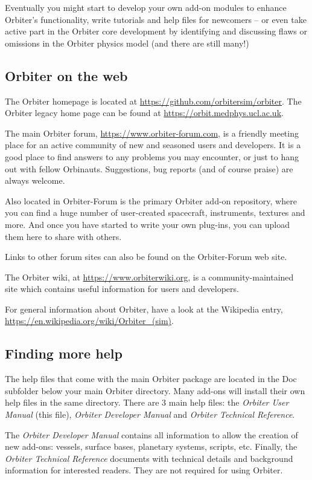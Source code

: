 \documentclass[Orbiter User Manual.tex]{subfiles}
\begin{document}
Eventually you might start to develop your own add-on modules to enhance
Orbiter's functionality, write tutorials and help files for newcomers -- or even
take active part in the Orbiter core development by identifying and discussing
flaws or omissions in the Orbiter physics model (and there are still many!)


\subsection{Orbiter on the web}

The Orbiter homepage is located at \url{https://github.com/orbitersim/orbiter}.
The Orbiter legacy home page can be found at
\url{https://orbit.medphys.ucl.ac.uk}.

The main Orbiter forum, \url{https://www.orbiter-forum.com}, is a friendly
meeting place for an active community of new and seasoned users and developers.
It is a good place to find answers to any problems you may encounter, or just to
hang out with fellow Orbinauts. Suggestions, bug reports (and of course praise)
are always welcome.

Also located in Orbiter-Forum is the primary Orbiter add-on repository, where
you can find a huge number of user-created spacecraft, instruments, textures and
more. And once you have started to write your own plug-ins, you can upload them
here to share with others.

Links to other forum sites can also be found on the Orbiter-Forum web site.

The Orbiter wiki, at \url{https://www.orbiterwiki.org}, is a
community-maintained site which contains useful information for users and
developers.

For general information about Orbiter, have a look at the Wikipedia entry,
\url{https://en.wikipedia.org/wiki/Orbiter_(sim)}.


\subsection{Finding more help}

The help files that come with the main Orbiter package are located in the Doc
subfolder below your main Orbiter directory. Many add-ons will install their own
help files in the same directory. There are 3 main help files: the \emph{Orbiter
User Manual} (this file), \emph{Orbiter Developer Manual} and \emph{Orbiter
Technical Reference}.

The \emph{Orbiter Developer Manual} contains all information to allow the
creation of new add-ons: vessels, surface bases, planetary systems, scripts,
etc. Finally, the \emph{Orbiter Technical Reference} documents with technical
details and background information for interested readers. They are not required
for using Orbiter.
\end{document}
